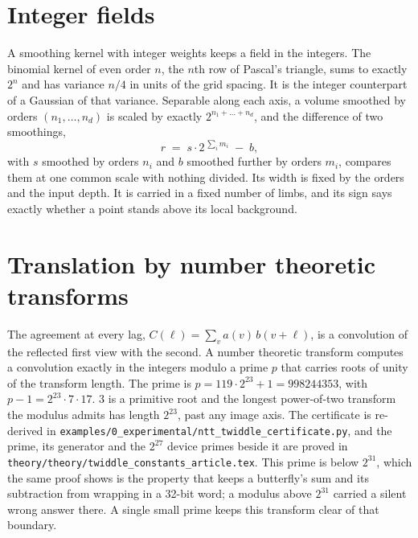 \section{Integer fields}

A smoothing kernel with integer weights keeps a field in the integers. The binomial kernel of even
order \(n\), the \(n\)th row of Pascal's triangle, sums to exactly \(2^n\) and has variance \(n/4\) in units of
the grid spacing. It is the integer counterpart of a Gaussian of that variance. Separable along each
axis, a volume smoothed by orders \((n_1, \dots, n_d)\) is scaled by exactly \(2^{n_1 + \dots + n_d}\), and
the difference of two smoothings,
\[
r \;=\; s \cdot 2^{\,\sum_i m_i} \;-\; b,
\]
with \(s\) smoothed by orders \(n_i\) and \(b\) smoothed further by orders \(m_i\), compares them at one common
scale with nothing divided. Its width is fixed by the orders and the input depth. It is carried in a
fixed number of limbs, and its sign says exactly whether a point stands above its local background.

\section{Translation by number theoretic transforms}

The agreement at every lag, \(C(\ell) = \sum_v a(v)\, b(v + \ell)\), is a convolution of the reflected
first view with the second. A number theoretic transform computes a convolution exactly in the
integers modulo a prime \(p\) that carries roots of unity of the transform length. The prime is
\(p = 119 \cdot 2^{23} + 1 = 998244353\), with \(p - 1 = 2^{23} \cdot 7 \cdot 17\). 3 is a primitive
root and the longest power-of-two transform the modulus admits has length \(2^{23}\), past any image
axis. The certificate is re-derived in
\texttt{examples/\allowbreak{}0\_experimental/\allowbreak{}ntt\_twiddle\_certificate.py}, and the prime,
its generator and the \(2^{27}\) device primes beside it are proved in
\texttt{theory/\allowbreak{}theory/\allowbreak{}twiddle\_constants\_article.tex}. This prime is below \(2^{31}\),
which the same proof shows is the property that keeps a butterfly's sum and its subtraction from
wrapping in a 32-bit word; a modulus above \(2^{31}\) carried a silent wrong answer there. A single
small prime keeps this transform clear of that boundary.

